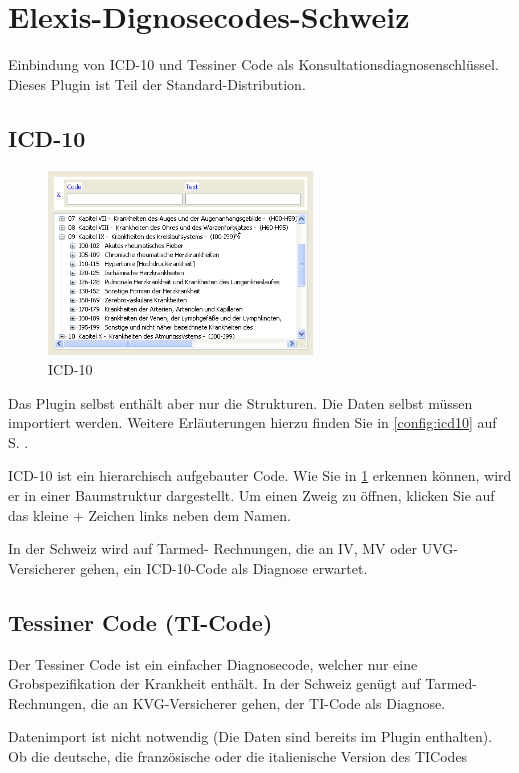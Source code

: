 \section{Elexis-Dignosecodes-Schweiz}
Einbindung von ICD-10 und Tessiner Code als Konsultationsdiagnosenschlüssel. Dieses Plugin ist Teil der Standard-Distribution. 

\subsection{ICD-10}
\begin{figure}
\includegraphics[width=7cm]{images/icd10}
\caption{ICD-10}
\label{fig:icd10}
\end{figure}

Das Plugin selbst enthält aber nur die Strukturen. Die Daten selbst müssen importiert werden. Weitere Erläuterungen hierzu finden Sie in \ref{config:icd10} auf S. \pageref{config:icd10}.

\medskip

ICD-10 ist ein hierarchisch aufgebauter Code. Wie Sie in \ref{fig:icd10} erkennen können, wird er in einer Baumstruktur dargestellt. Um einen Zweig zu öffnen, klicken Sie auf das kleine + Zeichen links neben dem Namen. 

In der Schweiz wird auf Tarmed- Rechnungen, die an IV, MV oder UVG-Versicherer gehen, ein ICD-10-Code als Diagnose erwartet.

\subsection{Tessiner Code (TI-Code)}
Der Tessiner Code ist ein einfacher Diagnosecode, welcher nur eine Grobspezifikation der Krankheit enthält. In der Schweiz genügt auf Tarmed-Rechnungen, die an KVG-Versicherer gehen, der TI-Code als Diagnose.

Datenimport ist nicht notwendig (Die Daten sind bereits im Plugin enthalten). Ob die deutsche, die französische oder die italienische Version des TICodes 